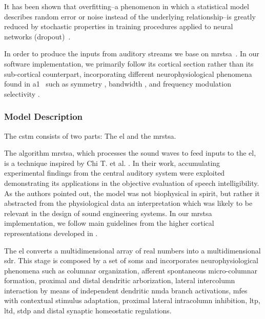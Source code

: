 \documentclass[10pt,letterpaper]{article}
\begin{document}
It has been shown that overfitting--a phenomenon in which a statistical model describes random error or noise instead of the underlying relationship--is greatly reduced by stochastic properties in training procedures applied to neural networks (dropout)~\cite{JMLR:v15:srivastava14a}.

In order to produce the inputs from auditory streams we base on \gls{mrstsa}~\cite{chi_2005}. In our software implementation, we primarily follow its cortical section rather than its sub-cortical counterpart, incorporating different neurophysiological phenomena found in \gls{a1}~\cite{wang_1995} such as symmetry \cite{shamma_1993}, bandwidth \cite{schreiner_1990}, and frequency modulation selectivity \cite{shamma_1993,heil_1992,mendelson_1985}.








\subsubsection*{Model Description}
\label{model-description}

The \gls{cstm} consists of two parts: The \gls{el} and the \gls{mrstsa}.  

The algorithm \gls{mrstsa}, which processes the sound waves to feed inputs to the \gls{el}, is a technique inspired by Chi T. et al. \cite{chi_2005}. In their work, accumulating experimental findings from the central auditory system were exploited demonstrating its applications in the objective evaluation of speech intelligibility. As the authors pointed out, the model was not biophysical in spirit, but rather it abstracted from the physiological data an interpretation which was likely to be relevant in the design of sound engineering systems. In our \gls{mrstsa} implementation, we follow main guidelines from the higher cortical representations developed in \cite{chi_2005}.

The \gls{el} converts a multidimensional array of real numbers into a multidimensional \gls{sdr}. This stage is composed by a set of \glspl{som} \cite{kohonen_2082, Kohonen:1989:SAM:69371} and incorporates neurophysiological phenomena such as columnar organization, afferent spontaneous micro-columnar formation, proximal and distal dendritic arborization, lateral intercolumn interaction by means of independent dendritic \gls{nmda} branch activations, \glspl{mfe} with contextual stimulus adaptation, proximal lateral intracolumn inhibition, \gls{ltp}, \gls{ltd}, \gls{stdp} and distal synaptic homeostatic regulations.
\end{document}
